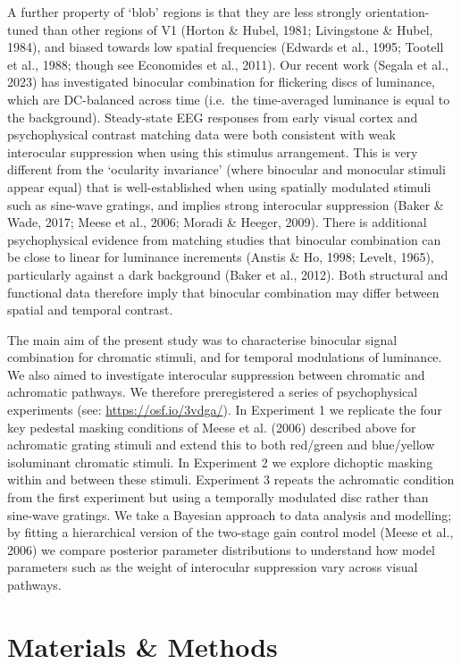 \documentclass[
  letterpaper,
  DIV=11,
  numbers=noendperiod]{scrartcl}
\begin{document}
A further property of `blob' regions is that they are less strongly
orientation-tuned than other regions of V1 (Horton \& Hubel, 1981;
Livingstone \& Hubel, 1984), and biased towards low spatial frequencies
(Edwards et al., 1995; Tootell et al., 1988; though see Economides et
al., 2011). Our recent work (Segala et al., 2023) has investigated
binocular combination for flickering discs of luminance, which are
DC-balanced across time (i.e.~the time-averaged luminance is equal to
the background). Steady-state EEG responses from early visual cortex and
psychophysical contrast matching data were both consistent with weak
interocular suppression when using this stimulus arrangement. This is
very different from the `ocularity invariance' (where binocular and
monocular stimuli appear equal) that is well-established when using
spatially modulated stimuli such as sine-wave gratings, and implies
strong interocular suppression (Baker \& Wade, 2017; Meese et al., 2006;
Moradi \& Heeger, 2009). There is additional psychophysical evidence
from matching studies that binocular combination can be close to linear
for luminance increments (Anstis \& Ho, 1998; Levelt, 1965),
particularly against a dark background (Baker et al., 2012). Both
structural and functional data therefore imply that binocular
combination may differ between spatial and temporal contrast.

The main aim of the present study was to characterise binocular signal
combination for chromatic stimuli, and for temporal modulations of
luminance. We also aimed to investigate interocular suppression between
chromatic and achromatic pathways. We therefore preregistered a series
of psychophysical experiments (see: \url{https://osf.io/3vdga/}). In
Experiment 1 we replicate the four key pedestal masking conditions of
Meese et al. (2006) described above for achromatic grating stimuli and
extend this to both red/green and blue/yellow isoluminant chromatic
stimuli. In Experiment 2 we explore dichoptic masking within and between
these stimuli. Experiment 3 repeats the achromatic condition from the
first experiment but using a temporally modulated disc rather than
sine-wave gratings. We take a Bayesian approach to data analysis and
modelling; by fitting a hierarchical version of the two-stage gain
control model (Meese et al., 2006) we compare posterior parameter
distributions to understand how model parameters such as the weight of
interocular suppression vary across visual pathways.

\hypertarget{materials-methods}{%
\section{Materials \& Methods}\label{materials-methods}}
\end{document}
